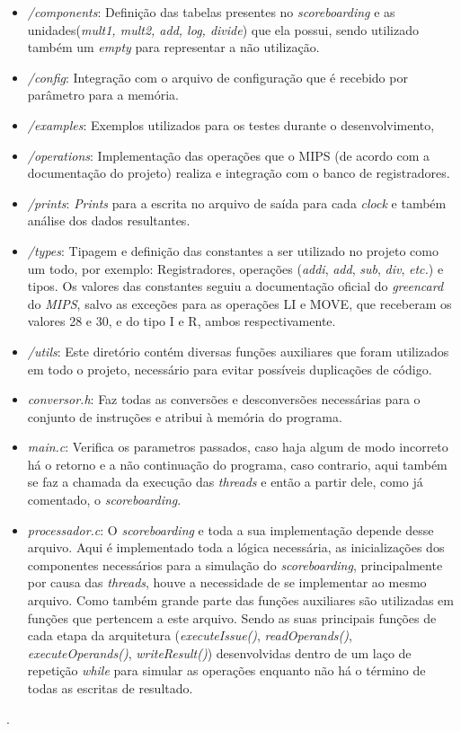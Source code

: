 \documentclass[journal]{IEEEtran}
\begin{document}
\begin{itemize}
    \item \textit{/components}: Definição das tabelas presentes no \textit{scoreboarding} e as unidades(\textit{mult1, mult2, add, log, divide}) que ela possui, sendo utilizado também um \textit{empty} para representar a não utilização.
    \item \textit{/config}: Integração com o arquivo de configuração que é recebido por parâmetro para a memória.  
    \item \textit{/examples}: Exemplos utilizados para os testes durante o desenvolvimento,
    \item \textit{/operations}: Implementação das operações que o MIPS (de acordo com a documentação do projeto) realiza e integração com o banco de registradores.
    \item \textit{/prints}: \textit{Prints} para a escrita no arquivo de saída para cada \textit{clock} e também análise dos dados resultantes. 
    \item \textit{/types}: Tipagem e definição das constantes a ser utilizado no projeto como um todo, por exemplo: Registradores, operações (\textit{addi}, \textit{add}, \textit{sub}, \textit{div},  \textit{etc.}) e tipos. Os valores das constantes seguiu a documentação oficial do \textit{greencard} do \textit{MIPS}, salvo as exceções para as operações LI e MOVE, que receberam os valores 28 e 30, e do tipo I e R, ambos respectivamente.
    \item \textit{/utils}: Este diretório contém diversas funções auxiliares que foram utilizados em todo o projeto, necessário para evitar possíveis duplicações de código.
    \item \textit{conversor.h}: Faz todas as conversões e desconversões necessárias para o conjunto de instruções e atribui à memória do programa.
    \item \textit{main.c}:  Verifica os parametros passados, caso haja algum de modo incorreto há o retorno e a não continuação do programa, caso contrario, aqui também se faz a chamada da execução das \textit{threads} e então a partir dele, como já comentado, o \textit{scoreboarding}.
    \item \textit{processador.c}: O \textit{scoreboarding} e toda a sua implementação depende desse arquivo. Aqui é implementado toda a lógica necessária, as inicializações dos componentes necessários para a simulação do \textit{scoreboarding}, principalmente por causa das \textit{threads}, houve a necessidade de se implementar ao mesmo arquivo. Como também grande parte das funções auxiliares são utilizadas em funções que pertencem a este arquivo. Sendo as suas principais funções de cada etapa da arquitetura (\textit{executeIssue()}, \textit{readOperands()}, \textit{executeOperands()}, \textit{writeResult()}) desenvolvidas dentro de um laço de repetição \textit{while} para simular as operações enquanto não há o término de todas as escritas de resultado. 
\end{itemize}.
\end{document}
